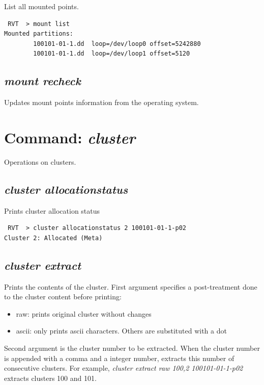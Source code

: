 \documentclass[a4paper,11pt,oneside]{report}
\begin{document}
List all mounted points.

\begin{verbatim}
 RVT  > mount list
Mounted partitions: 
        100101-01-1.dd  loop=/dev/loop0 offset=5242880
        100101-01-1.dd  loop=/dev/loop1 offset=5120
\end{verbatim}


\subsection{\emph{mount recheck}}

Updates mount points information from the operating system.



\section{Command: \emph{cluster}}

Operations on clusters.

\subsection{\emph{cluster allocationstatus}}

Prints cluster allocation status

\begin{verbatim}
 RVT  > cluster allocationstatus 2 100101-01-1-p02
Cluster 2: Allocated (Meta)
\end{verbatim}


\subsection{\emph{cluster extract}}

Prints the contents of the cluster. First argument specifies a post-treatment done to the cluster content before printing:

\begin{itemize}
\item raw:  prints original cluster without changes
\item ascii:  only prints ascii characters. Others are substituted with a dot
\end{itemize}

Second argument is the cluster number to be extracted. When the cluster number is appended with a comma and a integer number, extracts this number of consecutive clusters. For example, \emph{cluster extract raw 100,2 100101-01-1-p02} extracts clusters 100 and 101.
\end{document}

